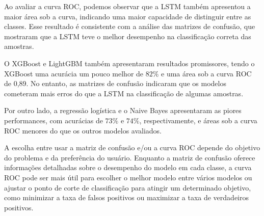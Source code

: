 Ao avaliar a curva ROC, podemos observar que a LSTM também apresentou a maior área sob a curva, indicando uma maior capacidade de distinguir entre as classes. Esse resultado é consistente com a análise das matrizes de confusão, que mostraram que a LSTM teve o melhor desempenho na classificação correta das amostras.

O XGBoost e LightGBM também apresentaram resultados promissores, tendo o XGBoost uma acurácia um pouco melhor de $82\%$ e uma área sob a curva ROC de 0,89. No entanto, as matrizes de confusão indicaram que os modelos cometeram mais erros do que a LSTM na classificação de algumas amostras.

Por outro lado, a regressão logística e o Naive Bayes apresentaram as piores performances, com acurácias de $73\%$ e $74\%$, respectivamente, e áreas sob a curva ROC menores do que os outros modelos avaliados.

A escolha entre usar a matriz de confusão e/ou a curva ROC depende do objetivo do problema e da preferência do usuário. Enquanto a matriz de confusão oferece informações detalhadas sobre o desempenho do modelo em cada classe, a curva ROC pode ser mais útil para escolher o melhor modelo entre vários modelos ou ajustar o ponto de corte de classificação para atingir um determinado objetivo, como minimizar a taxa de falsos positivos ou maximizar a taxa de verdadeiros positivos.

